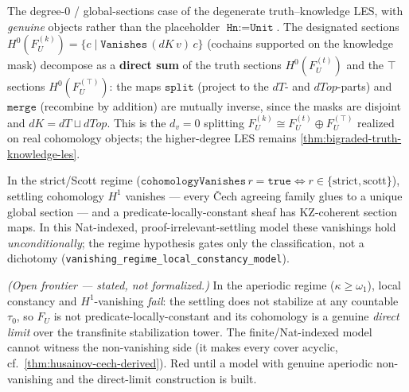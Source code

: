 \begin{theorem}\label{thm:bigraded-truth-knowledge-decomposition}\leanok{}
The degree-0 / global-sections case of the degenerate truth--knowledge LES, with \emph{genuine}
objects rather than the placeholder $\texttt{Hn}:=\texttt{Unit}$. The designated sections
$H^0(F_U^{(k)}) = \{c \mid \texttt{Vanishes}\,(dK\,v)\,c\}$ (cochains supported on the knowledge mask)
decompose as a \textbf{direct sum} of the truth sections $H^0(F_U^{(t)})$ and the $\top$ sections
$H^0(F_U^{(\top)})$: the maps $\texttt{split}$ (project to the $dT$- and $dTop$-parts) and
$\texttt{merge}$ (recombine by addition) are mutually inverse, since the masks are disjoint and
$dK = dT \sqcup dTop$. This is the $d_v=0$ splitting $F_U^{(k)} \cong F_U^{(t)} \oplus F_U^{(\top)}$
realized on real cohomology objects; the higher-degree LES remains
\cref{thm:bigraded-truth-knowledge-les}.
\end{theorem}

\begin{theorem}\label{thm:local-constancy-model}\leanok{}
In the strict/Scott regime ($\texttt{cohomologyVanishes}\,r=\texttt{true}\iff r\in\{\text{strict},\text{scott}\}$),
settling cohomology $H^1$ vanishes --- every \v{C}ech agreeing family glues to a unique global
section --- and a predicate-locally-constant sheaf has KZ-coherent section maps. In this
Nat-indexed, proof-irrelevant-settling model these vanishings hold \emph{unconditionally}; the
regime hypothesis gates only the classification, not a dichotomy
(\texttt{vanishing\_regime\_local\_constancy\_model}).
\end{theorem}

\begin{theorem}\label{thm:aperiodic-local-constancy-failure}\notready{}
\emph{(Open frontier --- stated, not formalized.)} In the aperiodic regime ($\kappa\ge\omega_1$),
local constancy and $H^1$-vanishing \emph{fail}: the settling does not stabilize at any countable
$\tau_0$, so $F_U$ is not predicate-locally-constant and its cohomology is a genuine \emph{direct
limit} over the transfinite stabilization tower. The finite/Nat-indexed model cannot witness the
non-vanishing side (it makes every cover acyclic, cf.\ \cref{thm:husainov-cech-derived}). Red until
a model with genuine aperiodic non-vanishing and the direct-limit construction is built.
\end{theorem}
